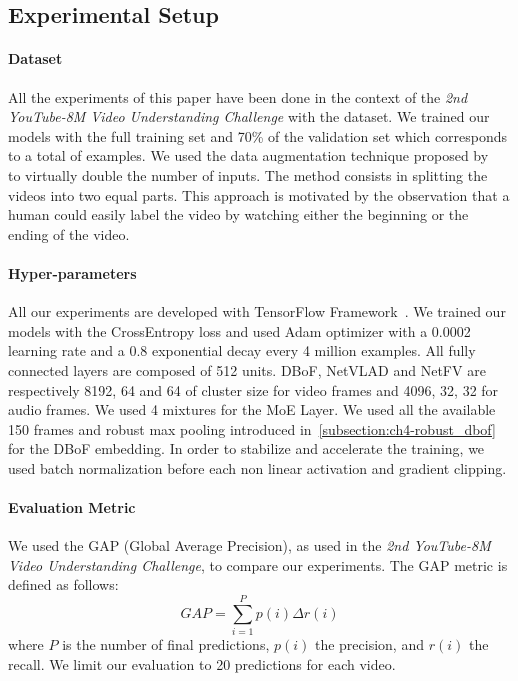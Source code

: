 \subsection{Experimental Setup}

\paragraph{Dataset}
All the experiments of this paper have been done in the context of the \emph{2nd YouTube-8M Video Understanding Challenge} with the \yt dataset.
We trained our models with the full training set and 70\% of the validation set which corresponds to a total of  examples.
We used the data augmentation technique proposed by~\citet{skalic2017deep} to virtually double the number of inputs. 
The method consists in splitting the videos into two equal parts.
This approach is motivated by the observation that a human could easily label the video by watching either the beginning or the ending of the video. 

\paragraph{Hyper-parameters}
All our experiments are developed with TensorFlow Framework~\cite{tensorflow2015-whitepaper}.
We trained our models with the CrossEntropy loss and used Adam optimizer with a 0.0002 learning rate and a 0.8 exponential decay every 4 million examples.
All fully connected layers are composed of 512 units.
DBoF, NetVLAD and NetFV are respectively 8192, 64 and 64 of cluster size for video frames and 4096, 32, 32 for audio frames.
We used 4 mixtures for the MoE Layer.
We used all the available 150 frames and robust max pooling introduced in~\ref{subsection:ch4-robust_dbof} for the DBoF embedding.
In order to stabilize and accelerate the training, we used batch normalization before each non linear activation and gradient clipping. 

\paragraph{Evaluation Metric}
We used the GAP (Global Average Precision), as used in the \emph{2nd YouTube-8M Video Understanding Challenge}, to compare our experiments. The GAP metric is defined as follows:
\begin{equation}
  GAP = \sum_{i=1}^{P}p(i) \Delta r(i)
\end{equation}
where $P$ is the number of final predictions, $p(i)$ the precision, and $r(i)$ the recall.
We limit our evaluation to 20 predictions for each video. 

